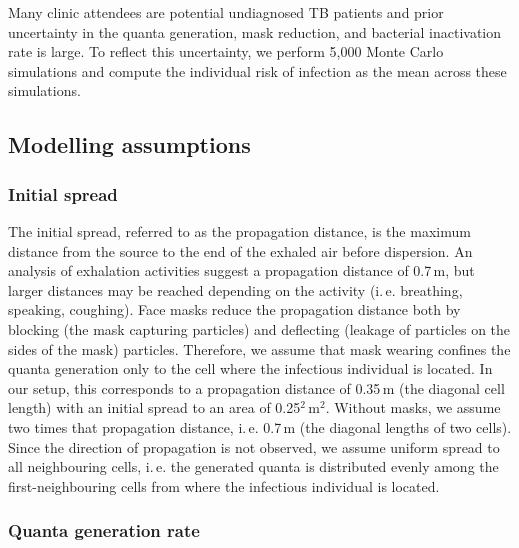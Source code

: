 \documentclass[fleqn,11pt]{wlscirep_supp}
\newcommand\ie{i.\,e.\xspace}
\begin{document}
Many clinic attendees are potential undiagnosed TB patients and prior uncertainty in the quanta generation, mask reduction, and bacterial inactivation rate is large. To reflect this uncertainty, we perform 5,000 Monte Carlo simulations and compute the individual risk of infection as the mean across these simulations.  

\subsection{Modelling assumptions}\label{sec:priors}

\subsubsection{Initial spread}

The initial spread, referred to as the propagation distance, is the maximum distance from the source to the end of the exhaled air before dispersion. An analysis of exhalation activities suggest a propagation distance of 0.7\,m\cite{Tang2013PLoSOne}, but larger distances may be reached depending on the activity (\ie breathing, speaking, coughing). Face masks reduce the propagation distance both by blocking (the mask capturing particles) and deflecting (leakage of particles on the sides of the mask) particles\cite{Tang2009RoyalInt,Hui2012PLoSOne,Mansour2013AerosolMed}. Therefore, we assume that mask wearing confines the quanta generation only to the cell where the infectious individual is located. In our setup, this corresponds to a propagation distance of 0.35\,m (the diagonal cell length) with an initial spread to an area of 0.25$^2$\,m$^2$. Without masks, we assume two times that propagation distance, \ie 0.7\,m (the diagonal lengths of two cells)\cite{Tang2013PLoSOne}. Since the direction of propagation is not observed, we assume uniform spread to all neighbouring cells, \ie the generated quanta is distributed evenly among the first-neighbouring cells from where the infectious individual is located.


\subsubsection{Quanta generation rate}
\end{document}
